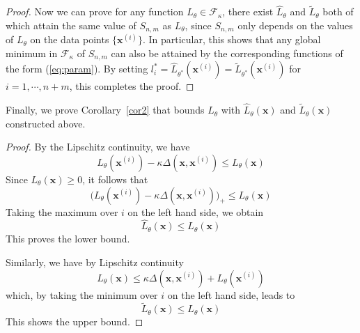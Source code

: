 \begin{proof}
Now we can prove %
for any function $L_\theta\in \mathcal F_\kappa$, there exist $\widehat L_\theta$ and $\widetilde L_\theta$ both of which attain the same value of $S_{n,m}$ as $L_\theta$, since $S_{n,m}$ only depends on the values of $L_\theta$ on the data points $\{\mathbf x^{(i)}\}$. In particular, this shows that any global minimum in $\mathcal F_\kappa$ of $S_{n,m}$ can also be attained by the corresponding functions of the form (\ref{eq:param}). By setting $l^*_i=\widehat L_{\theta^*}(\mathbf x^{(i)})=\widetilde L_{\theta^*}(\mathbf x^{(i)})$ for $i=1,\cdots,n+m$, this completes the proof.
\end{proof}

Finally, we prove Corollary~\ref{cor2} that bounds $L_\theta$ with $\widehat L_\theta(\mathbf x)$ and $\widetilde L_\theta(\mathbf x)$ constructed above.
\begin{proof}
By the Lipschitz continuity, we have
$$
L_\theta(\mathbf x^{(i)}) -  \kappa\Delta(\mathbf x,\mathbf x^{(i)}) \leq L_\theta(\mathbf x)
$$
Since $L_\theta(\mathbf x)\geq 0$, it follows that
$$
\big(L_\theta(\mathbf x^{(i)}) -  \kappa\Delta(\mathbf x,\mathbf x^{(i)})\big)_+ \leq L_\theta(\mathbf x)
$$
Taking the maximum over $i$ on the left hand side, we obtain
$$
\widehat L_\theta(\mathbf x) \leq L_\theta(\mathbf x)
$$
This proves the lower bound.

Similarly, we have by Lipschitz continuity
$$
L_\theta(\mathbf x) \leq  \kappa\Delta(\mathbf x,\mathbf x^{(i)}) + L_\theta(\mathbf x^{(i)})
$$
which, by taking the minimum over $i$ on the left hand side, leads to
$$
\widetilde L_\theta(\mathbf x) \leq L_\theta(\mathbf x)
$$
This shows the upper bound.
\end{proof}





